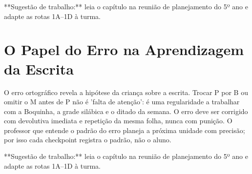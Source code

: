 \begin{dica}
**Sugestão de trabalho:** leia o capítulo na reunião de planejamento do 5º ano e adapte as rotas 1A–1D à turma.
\end{dica}

\chapter{O Papel do Erro na Aprendizagem da Escrita}

O erro ortográfico revela a hipótese da criança sobre a escrita. Trocar P por B ou omitir o M antes de P não é 'falta de atenção': é uma regularidade a trabalhar com a Boquinha, a grade silábica e o ditado da semana. O erro deve ser corrigido com devolutiva imediata e repetição da mesma folha, nunca com punição. O professor que entende o padrão do erro planeja a próxima unidade com precisão; por isso cada checkpoint registra o padrão, não o aluno.


\begin{dica}
**Sugestão de trabalho:** leia o capítulo na reunião de planejamento do 5º ano e adapte as rotas 1A–1D à turma.
\end{dica}
